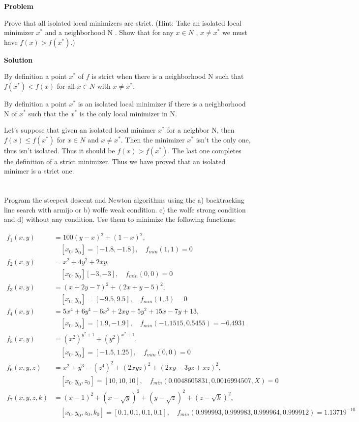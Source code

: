 \documentclass[a4paper,11pt]{article}
\numberwithin{equation}{section} %
\begin{document}
\textbf{Problem}

Prove that all isolated local minimizers are strict. (Hint: Take an isolated local
minimizer $x^{*}$ and a neighborhood N . Show that for any $x \in N$ , $x \neq x^{*}$ we must have $f(x) > f(x^{*})$.)

\textbf{Solution}

By definition a point $x^{*}$ of $f$ is strict when there is a neighborhood N such that $f(x^{*}) < f(x)$ for all $x \in N$ with $x \neq x^{*}$.

By definition a point $x^{*}$ is an isolated local minimizer if there is a neighborhood N of $x^{*}$ such that the $x^{*}$ is the only local minimizer in N.

Let's suppose that given an isolated local minimer $x^{*}$ for a neighbor N, then $f(x) \leq f(x^{*})$ for $x \in N$ and $x \neq x^{*}$. Then the minimizer $x^{*}$ isn't the only one, thus isn't isolated. Thus it should be $f(x) > f(x^{*})$. The last one completes the definition of a strict minimizer. Thus we have proved that an isolated minimer is a strict one.

\pagebreak


\section{}

Program the steepest descent and Newton algorithms using the a) backtracking line search with armijo or b) wolfe weak condition. c) the wolfe strong condition and d) without any condition. Use them to minimize the following functions:

\begin{align*}
    f_1(x,y) &= 100 (y-x)^2 + (1-x)^2, \\ &\quad [x_0,y_0] = [-1.8,-1.8], \quad f_{min}(1,1)=0  \\
    f_2(x,y) &= x^2 + 4y^2 + 2xy, \\ & \quad [x_0,y_0] [-3,-3], \quad f_{min}(0,0) = 0 \\
    f_3(x,y) &= (x+2y-7)^2 + (2x+y-5)^2, \\ & \quad [x_0,y_0] = [-9.5,9.5], \quad f_{min}(1,3) = 0 \\
    f_4(x,y) &= 5x^4 + 6y^4 - 6x^2 + 2xy + 5y^2 + 15x -7y + 13, \\ & \quad [x_0,y_0] = [1.9,-1.9], \quad f_{min}(-1.1515,0.5455) = -6.4931 \\ 
    f_5(x,y) &= (x^2)^{y^2+1} + (y^2)^{x^2+1},\\ & \quad [x_0,y_0] = [-1.5,1.25], \quad f_{min}(0,0) = 0 \\
    f_6(x,y,z) &= x^2 + y^3 - (z^4)^2 + (2xyz)^2 + (2xy-3yz+xz)^2, \\ & \quad [x_0,y_0,z_0] = [10,10,10], \quad f_{min}(0.0048605831,0.0016994507,X) = 0 \\
    f_7(x,y,z,k) &= (x-1)^2 + (x-\sqrt{y})^2 + (y-\sqrt{z})^2 + (z-\sqrt{k})^2, \\ & \quad [x_0,y_0,z_0,k_0] = [0.1,0.1,0.1,0.1], \quad f_{min}(0.999993,0.999983,0.999964,0.999912) = 1.13719^{-10} \\
\end{align*}
\end{document}
